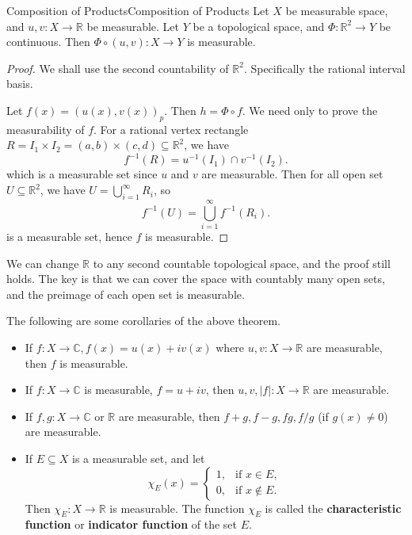 \documentclass[../main.tex]{subfiles}
\begin{document}
\begin{theorem}{Composition of Products}{Composition of Products}
Let $X$ be measurable space, and $u,v: X \rightarrow \mathbb{R}$ be measurable. Let $Y$ be a topological space, and $\Phi: \mathbb{R}^2 \rightarrow Y$ be continuous. Then $\Phi \circ (u,v): X \rightarrow Y$ is measurable.
\end{theorem}
\begin{proof}
We shall use the second countability of $\mathbb{R}^2$. Specifically the rational interval basis.

Let $f(x) = (u(x),v(x))_p$. Then $h = \Phi\circ f$. We need only to prove the measurability of $f$. For a rational vertex rectangle $R=I_1 \times I_2 = (a,b) \times (c,d) \subseteq \mathbb{R}^2$, we have
\begin{equation*}
	f^{-1}(R) = u^{-1}(I_1) \cap v^{-1}(I_2).
\end{equation*}
which is a measurable set since $u$ and $v$ are measurable. Then for all open set $U \subseteq \mathbb{R}^2$, we have $U = \bigcup_{i=1}^{\infty } R_i$, so
\begin{equation*}
	f^{-1}(U) = \bigcup_{i=1}^{\infty} f^{-1}(R_i).
\end{equation*}
is a measurable set, hence $f$ is measurable.
\end{proof}
\begin{remark}
We can change $\mathbb{R}$ to any second countable topological space, and the proof still holds. The key is that we can cover the space with countably many open sets, and the preimage of each open set is measurable.
\end{remark}

The following are some corollaries of the above theorem.
\begin{itemize}
	\item If $f: X \rightarrow \mathbb{C}, f(x) = u(x) + iv(x)$ where $u,v: X \rightarrow \mathbb{R}$ are measurable, then $f$ is measurable.
	\item If $f:X \rightarrow \mathbb{C}$ is measurable, $f=u+iv$, then $u,v,|f|: X \rightarrow \mathbb{R}$ are measurable.
	\item If $f,g: X \rightarrow \mathbb{C}$ or $\mathbb{R}$ are measurable, then $f+g, f-g, fg, f / g$ (if $g(x) \neq 0$) are measurable.
	\item If $E \subseteq X$ is a measurable set, and let
		\begin{equation}
		\chi_E(x) =
		\begin{cases}
			1, & \text{if } x \in E, \\
			0, & \text{if } x \notin E.
		\end{cases}
		\end{equation}
		Then $\chi_E: X \rightarrow \mathbb{R}$ is measurable. The function $\chi_E$ is called the \textbf{characteristic function} or \textbf{indicator function} of the set $E$.
\end{itemize}
\end{document}
